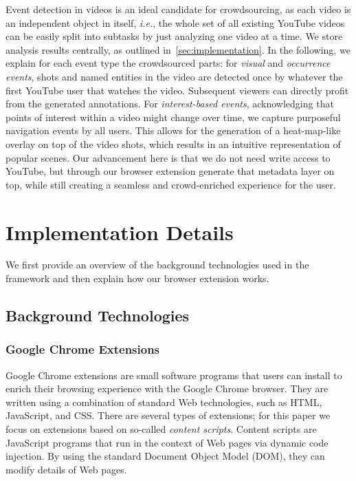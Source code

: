 \documentclass[runningheads,a4paper]{llncs}
\begin{document}
Event detection in videos is an ideal candidate for crowdsourcing, as each video is an independent object in itself, \emph{i.e.}, the whole set of all existing YouTube videos can be easily split into subtasks by just analyzing one video at a time. We store analysis results centrally, as outlined in~\autoref{sec:implementation}. In the following, we explain for each event type the crowdsourced parts: for \emph{visual} and \emph{occurrence events}, shots and named entities in the video are detected once by whatever the first YouTube user that watches the video. Subsequent viewers can directly profit from the generated annotations. For \emph{interest-based events}, acknowledging that points of interest within a video might change over time, we capture purposeful navigation events by all users. This allows for the generation of a heat-map-like overlay on top of the video shots, which results in an intuitive representation of popular scenes. Our advancement here is that we do not need write access to YouTube, but through our browser extension generate that metadata layer on top, while still creating a seamless and crowd-enriched experience for the user. 

\section{Implementation Details} \label{sec:implementation}
We first provide an overview of the background technologies used in the framework and then explain how our browser extension works.

\subsection{Background Technologies}

\subsubsection{Google Chrome Extensions}
Google Chrome extensions are small software programs that users can install to enrich their browsing experience with the Google Chrome browser. They are written using a combination of standard Web technologies, such as HTML, JavaScript, and CSS. There are several types of extensions; for this paper we focus on extensions based on so-called \emph{content scripts}. Content scripts are JavaScript programs that run in the context of Web pages via dynamic code injection. By using the standard Document Object Model (DOM), they can modify details of Web pages.
\end{document}
